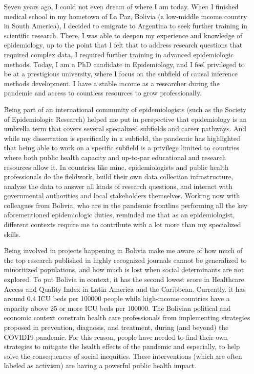 \documentclass[
]{book}
\begin{document}
Seven years ago, I could not even dream of where I am today. When I finished medical school in my hometown of La Paz, Bolivia (a low-middle income country in South America), I decided to emigrate to Argentina to seek further training in scientific research. There, I was able to deepen my experience and knowledge of epidemiology, up to the point that I felt that to address research questions that required complex data, I required further training in advanced epidemiologic methods. Today, I am a PhD candidate in Epidemiology, and I feel privileged to be at a prestigious university, where I focus on the subfield of causal inference methods development. I have a stable income as a researcher during the pandemic and access to countless resources to grow professionally.

Being part of an international community of epidemiologists (such as the Society of Epidemiologic Research) helped me put in perspective that epidemiology is an umbrella term that covers several specialized subfields and career pathways. And while my dissertation is specifically in a subfield, the pandemic has highlighted that being able to work on a specific subfield is a privilege limited to countries where both public health capacity and up-to-par educational and research resources allow it. In countries like mine, epidemiologists and public health professionals do the fieldwork, build their own data collection infrastructure, analyze the data to answer all kinds of research questions, and interact with governmental authorities and local stakeholders themselves. Working now with colleagues from Bolivia, who are in the pandemic frontline performing all the key aforementioned epidemiologic duties, reminded me that as an epidemiologist, different contexts require me to contribute with a lot more than my specialized skills.

Being involved in projects happening in Bolivia make me aware of how much of the top research published in highly recognized journals cannot be generalized to minoritized populations, and how much is lost when social determinants are not explored. To put Bolivia in context, it has the second lowest score in Healthcare Access and Quality Index in Latin America and the Caribbean\autocite{fullman2018}. Currently, it has around 0.4 ICU beds per 100000 people\autocite{almeida2021} while high-income countries have a capacity above 25 or more ICU beds per 100000\autocite{halpern2020}. The Bolivian political and economic context\autocite{trigo2020} constrain health care professionals from implementing strategies proposed in prevention, diagnosis, and treatment, during (and beyond) the COVID19 pandemic. For this reason, people have needed to find their own strategies to mitigate the health effects of the pandemic and especially, to help solve the consequences of social inequities. These interventions (which are often labeled as activism) are having a powerful public health impact.
\end{document}

